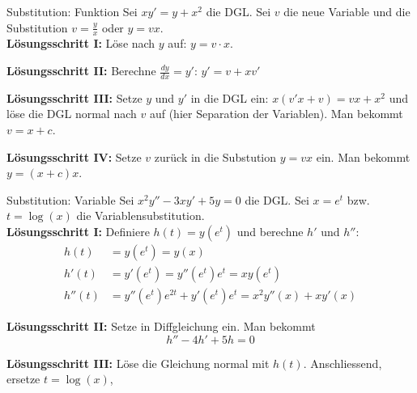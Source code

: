 \begin{Beispiel}{Substitution: Funktion}{}
		Sei $xy'=y+x^2$ die DGL. Sei $v$ die neue Variable und die Substitution $v = \frac{y}{x}$ oder $y=vx$.\\
	
	\textbf{Lösungsschritt I:} Löse nach $y$ auf: $y = v \cdot x$.
	
	\textbf{Lösungsschritt II:} Berechne $\frac{dy}{dx} = y'$: $y' = v + x v'$
	
	\textbf{Lösungsschritt III:} Setze $y$ und $y'$ in die DGL ein: $x(v'x+v)=vx+x^2$ und löse die DGL normal nach $v$ auf (hier Separation der Variablen). Man bekommt $v=x+c$.
	
	\textbf{Lösungsschritt IV:} Setze $v$ zurück in die Substution $y=vx$ ein. Man bekommt $y=(x+c)x$.
\end{Beispiel}

\begin{Beispiel}{Substitution: Variable}{}
		Sei $x^2y'' - 3xy' + 5y = 0$ die DGL. Sei $x=e^t$ bzw. $t = \log(x)$ die Variablensubstitution.\\
	
	\textbf{Lösungsschritt I:} Definiere $h(t) = y(e^t)$ und berechne $h'$ und $h''$:
	\begin{align*}
		h(t) &= y(e^t) = y(x)\\
		h'(t) &= y'(e^t) = y''(e^t) e^t = xy(e^t)\\
		h''(t) &= y''(e^t)e^{2t}+y'(e^t)e^t = x^2y''(x)+xy'(x)
	\end{align*}
	
	\textbf{Lösungsschritt II:} Setze in Diffgleichung ein. Man bekommt
	\[
		h'' - 4h' + 5h = 0
	\]
	
	\textbf{Lösungsschritt III:} Löse die Gleichung normal mit $h(t)$. Anschliessend, ersetze $t=\log(x)$, 
\end{Beispiel}

